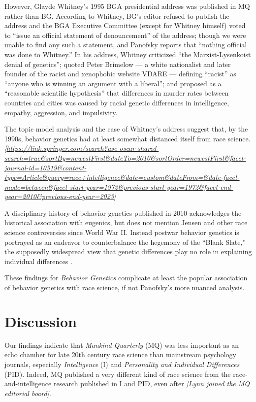 \documentclass[12pt]{article}
\begin{document}
However, Glayde Whitney's 1995 BGA presidential address was published in
MQ rather than BG. According to Whitney, BG's editor refused to publish
the address and the BGA Executive Committee (except for Whitney himself)
voted to ``issue an official statement of denouncement'' of the address;
though we were unable to find any such a statement, and Panofsky reports
that ``nothing official was done to Whitney.'' In his address, Whitney
criticized ``the Marxist-Lysenkoist denial of genetics''; quoted Peter
Brimelow --- a white nationalist and later founder of the racist and
xenophobic website VDARE --- defining ``racist'' as ``anyone who is
winning an argument with a liberal''; and proposed as a ``reasonable
scientific hypothesis'' that differences in murder rates between
countries and cities was caused by racial genetic differences in
intelligence, empathy, aggression, and impulsivity.

The topic model analysis and the case of Whitney's address suggest that,
by the 1990s, behavior genetics had at least somewhat distanced itself
from race science.
\emph{{[}\url{https://link.springer.com/search?use-oscar-shared-search=true\&sortBy=newestFirst\&dateTo=2010\&sortOrder=newestFirst\&facet-journal-id=10519\&content-type=Article\&query=race+intelligence\&date=custom\&dateFrom=\&date-facet-mode=between\&facet-start-year=1972\&previous-start-year=1972\&facet-end-year=2010\&previous-end-year=2023}{]}}

A disciplinary history of behavior genetics published in 2010
\cite{McGueEndBehavioralGenetics2010} acknowledges the historical
association with eugenics, but does not mention Jensen and other race
science controversies since World War II. Instead postwar behavior
genetics is portrayed as an endeavor to counterbalance the hegemony of
the ``Blank Slate,'' the supposedly widespread view that genetic
differences play no role in explaining individual differences
\cite{BatesonCorpseWearisomeDebate2002}.

These findings for \emph{Behavior Genetics} complicate at least the
popular association of behavior genetics with race science, if not
Panofsky's more nuanced analysis.

\hypertarget{discussion}{%
\section*{Discussion}\label{discussion}}

Our findings indicate that \emph{Mankind Quarterly} (MQ) was less
important as an echo chamber for late 20th century race science than
mainstream psychology journals, especially \emph{Intelligence} (I) and
\emph{Personality and Individual Differences} (PID). Indeed, MQ
published a very different kind of race science from the
race-and-intelligence research published in I and PID, even after
\emph{{[}Lynn joined the MQ editorial board{]}}.
\end{document}
